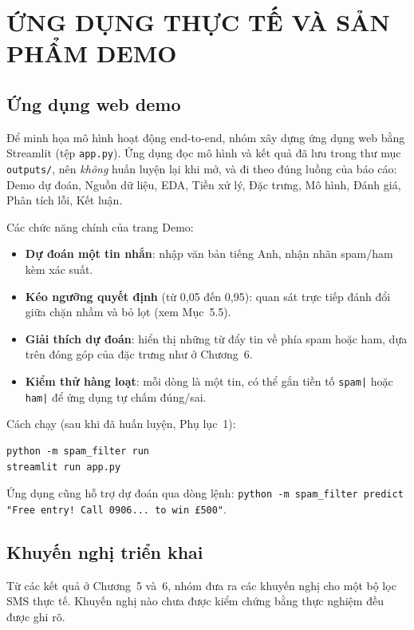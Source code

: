 \chapter{ỨNG DỤNG THỰC TẾ VÀ SẢN PHẨM DEMO}

\section{Ứng dụng web demo}

Để minh họa mô hình hoạt động end-to-end, nhóm xây dựng ứng dụng web bằng Streamlit (tệp \texttt{app.py}). Ứng dụng đọc mô hình và kết quả đã lưu trong thư mục \texttt{outputs/}, nên \textit{không} huấn luyện lại khi mở, và đi theo đúng luồng của báo cáo: Demo dự đoán, Nguồn dữ liệu, EDA, Tiền xử lý, Đặc trưng, Mô hình, Đánh giá, Phân tích lỗi, Kết luận.

Các chức năng chính của trang Demo:

\begin{itemize}
    \item \textbf{Dự đoán một tin nhắn}: nhập văn bản tiếng Anh, nhận nhãn spam/ham kèm xác suất.
    \item \textbf{Kéo ngưỡng quyết định} (từ 0,05 đến 0,95): quan sát trực tiếp đánh đổi giữa chặn nhầm và bỏ lọt (xem Mục~5.5).
    \item \textbf{Giải thích dự đoán}: hiển thị những từ đẩy tin về phía spam hoặc ham, dựa trên đóng góp của đặc trưng như ở Chương~6.
    \item \textbf{Kiểm thử hàng loạt}: mỗi dòng là một tin, có thể gắn tiền tố \texttt{spam|} hoặc \texttt{ham|} để ứng dụng tự chấm đúng/sai.
\end{itemize}

Cách chạy (sau khi đã huấn luyện, Phụ lục~1):

\begin{verbatim}
python -m spam_filter run
streamlit run app.py
\end{verbatim}

Ứng dụng cũng hỗ trợ dự đoán qua dòng lệnh: \texttt{python -m spam\_filter predict "Free entry! Call 0906... to win £500"}.

\section{Khuyến nghị triển khai}

Từ các kết quả ở Chương~5 và~6, nhóm đưa ra các khuyến nghị cho một bộ lọc SMS thực tế. Khuyến nghị nào chưa được kiểm chứng bằng thực nghiệm đều được ghi rõ.

